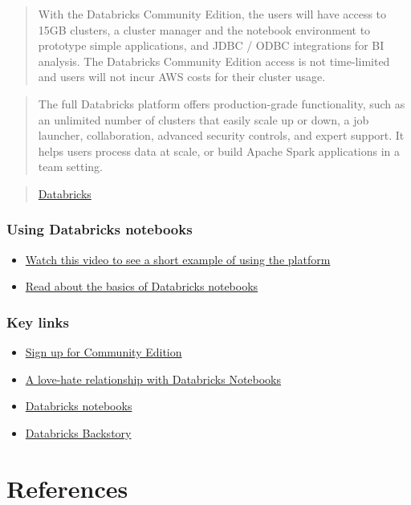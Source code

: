 \documentclass[
  letterpaper,
  DIV=11,
  numbers=noendperiod]{scrreprt}
\providecommand{\tightlist}{%
  \setlength{\itemsep}{0pt}\setlength{\parskip}{0pt}}\usepackage{longtable,booktabs,array}
\newlength{\cslhangindent}
\newlength{\cslentryspacingunit} %
\newenvironment{CSLReferences}[2] %
 {%
  \setlength{\parindent}{0pt}
  \ifodd #1
  \let\oldpar\par
  \def\par{\hangindent=\cslhangindent\oldpar}
  \fi
  \setlength{\parskip}{#2\cslentryspacingunit}
 }%
 {}
\begin{document}
\begin{quote}
With the Databricks Community Edition, the users will have access to
15GB clusters, a cluster manager and the notebook environment to
prototype simple applications, and JDBC / ODBC integrations for BI
analysis. The Databricks Community Edition access is not time-limited
and users will not incur AWS costs for their cluster usage.
\end{quote}

\begin{quote}
The full Databricks platform offers production-grade functionality, such
as an unlimited number of clusters that easily scale up or down, a job
launcher, collaboration, advanced security controls, and expert support.
It helps users process data at scale, or build Apache Spark applications
in a team setting.
\end{quote}

\begin{quote}
\href{https://databricks.com/product/faq/community-edition}{Databricks}
\end{quote}

\hypertarget{using-databricks-notebooks}{%
\subsection{Using Databricks
notebooks}\label{using-databricks-notebooks}}

\begin{itemize}
\tightlist
\item
  \href{https://youtu.be/n-yt_3HvkOI}{Watch this video to see a short
  example of using the platform}
\item
  \href{https://subscription.packtpub.com/book/data/9781838647216/2/ch02lvl1sec08/using-azure-databricks-notebooks}{Read
  about the basics of Databricks notebooks}
\end{itemize}

\hypertarget{key-links}{%
\subsection{Key links}\label{key-links}}

\begin{itemize}
\tightlist
\item
  \href{https://databricks.com/try-databricks}{Sign up for Community
  Edition}
\item
  \href{https://towardsdatascience.com/databricks-notebooks-a-love-hate-relationship-8f73e5b291fb}{A
  love-hate relationship with Databricks Notebooks}
\item
  \href{https://subscription.packtpub.com/book/data/9781838647216/2/ch02lvl1sec08/using-azure-databricks-notebooks}{Databricks
  notebooks}
\item
  \href{https://youtu.be/ThrmPaleEiI}{Databricks Backstory}
\end{itemize}


\hypertarget{references}{%
\chapter*{References}\label{references}}


\hypertarget{refs}{}
\begin{CSLReferences}{0}{0}
\end{CSLReferences}
\end{document}
